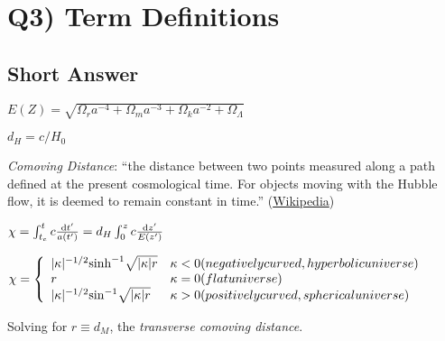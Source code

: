 \documentclass[\main/main.tex]{subfiles}
\begin{document}
	



\newpage
\section{Q3) Term Definitions} %
\label{sec:q3_term_definitions}

	\subsection{Short Answer} %
	\label{sub:short_answer}


	$E(Z) = \sqrt{\Omega_r a^{-4} + \Omega_m a^{-3} + \Omega_k a^{-2} + \Omega_\Lambda}$

	$d_H = c / H_0$

	{\it Comoving Distance}: ``the distance between two points measured along a path defined at the present cosmological time. For objects moving with the Hubble flow, it is deemed to remain constant in time.'' (\href{https://en.wikipedia.org/wiki/Comoving_and_proper_distances}{Wikipedia})

		$\chi = \int_{t_e}^{t} c \frac{\dif{t'}}{a(t')} = d_H \int_{0}^{z} c \frac{\dif{z'}}{E(z')}$

	$  \chi = \left\{
	\begin{array}{ll}
	      |\kappa|^{-1/2} {\sinh}^{-1}{\sqrt{|\kappa|r}} & \kappa<0 (negatively curved, hyperbolic universe) \\
	      r & \kappa=0 (flat universe) \\
	      |\kappa|^{-1/2} {\sin}^{-1}{\sqrt{|\kappa|r}} & \kappa>0 (positively curved, spherical universe) \\
	\end{array} 
	\right. $

	Solving for $r \equiv d_M$, the {\it transverse comoving distance}.
\end{document}
